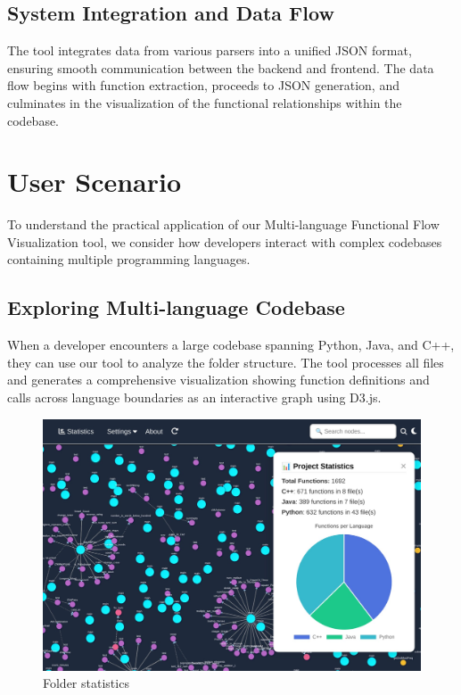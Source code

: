 \documentclass[10pt,twocolumn]{article}
\begin{document}
\subsection{System Integration and Data Flow}

The tool integrates data from various parsers into a unified JSON format, ensuring smooth communication between the backend and frontend. The data flow begins with function extraction, proceeds to JSON generation, and culminates in the visualization of the functional relationships within the codebase.



\section{User Scenario}

To understand the practical application of our Multi-language Functional Flow Visualization tool, we consider how developers interact with complex codebases containing multiple programming languages.

\subsection{Exploring Multi-language Codebase}

When a developer encounters a large codebase spanning Python, Java, and C++, they can use our tool to analyze the folder structure. The tool processes all files and generates a comprehensive visualization showing function definitions and calls across language boundaries as an interactive graph using D3.js.

\begin{figure}
    \centering
    \includegraphics[width=1\linewidth]{Image0.jpg}
    \caption{Folder statistics}
    \label{fig:enter-label}
\end{figure}
\end{document}
